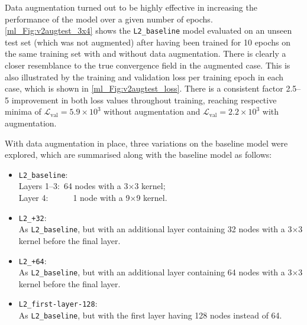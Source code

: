 Data augmentation turned out to be highly effective in increasing the performance of the model over a given number of epochs. \autoref{ml_Fig:v2augtest_3x4} shows the \texttt{L2\_baseline} model evaluated on an unseen test set (which was not augmented) after having been trained for 10 epochs on the same training set with and without data augmentation. There is clearly a closer resemblance to the true convergence field in the augmented case. This is also illustrated by the training and validation loss per training epoch in each case, which is shown in \autoref{ml_Fig:v2augtest_loss}. There is a consistent factor 2.5--5 improvement in both loss values throughout training, reaching respective minima of $\mathcal{L}_\text{val} = 5.9 \times 10^3$ without augmentation and $\mathcal{L}_\text{val} = 2.2 \times 10^3$ with augmentation.

With data augmentation in place, three variations on the baseline model were explored, which are summarised along with the baseline model as follows:
\begin{itemize}
\item \texttt{L2\_baseline}: \\
\hspace*{1em}Layers 1--3:~64 nodes with a 3$\times$3 kernel; \\
\hspace*{1em}Layer 4:~~~~~~1 node with a 9$\times$9 kernel.
\item \texttt{L2\_+32}: \\
\hspace*{1em}As \texttt{L2\_baseline}, but with an additional layer containing 32 nodes with a 3$\times$3 kernel before the final layer.
\item \texttt{L2\_+64}: \\
\hspace*{1em}As \texttt{L2\_baseline}, but with an additional layer containing 64 nodes with a 3$\times$3 kernel before the final layer.
\item \texttt{L2\_first-layer-128}: \\
\hspace*{1em}As \texttt{L2\_baseline}, but with the first layer having 128 nodes instead of 64.
\end{itemize}

